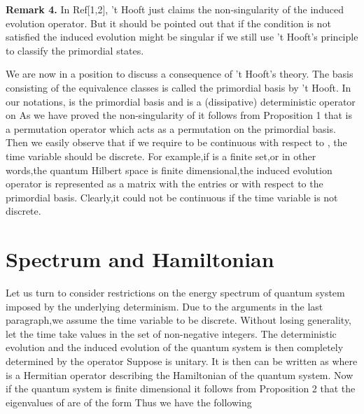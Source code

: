 \documentclass[a4paper,12pt]{article}
\begin{document}
\textbf{Remark 4.} In Ref[1,2], 't Hooft just claims the non-singularity of
the induced evolution operator. But it should be pointed out that if the
condition \coordHE{} is not satisfied the induced evolution \coordHE{} might be singular if we still use 't Hooft's
principle to classify the primordial states.

We are now in a position to discuss a consequence of 't Hooft's theory. The
basis consisting of the equivalence classes is called the primordial basis
by 't Hooft. In our notations,\coordHE{} is the
primordial basis and \coordHE{} is a (dissipative) deterministic operator on \coordHE{}
As we have proved the non-singularity of \coordHE{}it follows from
Proposition 1 that \coordHE{} is a permutation operator which acts as
a permutation on the primordial basis. Then we easily observe that if we
require \coordHE{} to be continuous with respect to \coordHE{}, the time
variable should be discrete. For example,if \coordHE{} is a finite set,or in other
words,the quantum Hilbert space is finite dimensional,the induced evolution
operator \coordHE{} is represented as a matrix with the entries \coordHE{}
or \coordHE{} with respect to the primordial basis. Clearly,it could not be
continuous if the time variable is not discrete.

\section{Spectrum and Hamiltonian}

Let us turn to consider restrictions on the energy spectrum of quantum
system imposed by the underlying determinism. Due to the arguments in the
last paragraph,we assume the time variable to be discrete. Without losing
generality, let the time \coordHE{} take values in \coordHE{}the set of non-negative
integers. The deterministic evolution and the induced evolution of the
quantum system is then completely determined by the operator \coordHE{} Suppose
\coordHE{} is unitary. It is then can be written as \coordHE{}where \coordHE{} is a Hermitian operator describing the Hamiltonian of
the quantum system. Now if the quantum system is finite dimensional it
follows from Proposition 2 that the eigenvalues of \coordHE{} are of
the form \coordHE{}Thus we have the following
\end{document}
